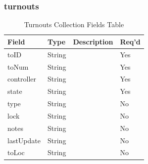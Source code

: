 \subsubsection{turnouts}
\begin{table}[H]
    \begin{tabular}{|L{3cm}|L{1.7cm}|L{8.8cm}|L{1.3cm}|}
    \hline
        \textbf{Field} & \textbf{Type} & \textbf{Description} & \textbf{Req'd} \\ \hline
	toID & String &  & Yes \\ \hline	
	toNum & String &  & Yes \\ \hline	
	controller & String &  & Yes \\ \hline	
	state & String &  & Yes \\ \hline
	type & String &  & No \\ \hline	
	lock & String &  & No \\ \hline	
	notes & String &  & No \\ \hline	
	lastUpdate & String &  & No \\ \hline	
	toLoc & String &  & No \\ \hline
    \end{tabular}
    \caption{\label{turnout-table}Turnouts Collection Fields Table}
    \end{table}




